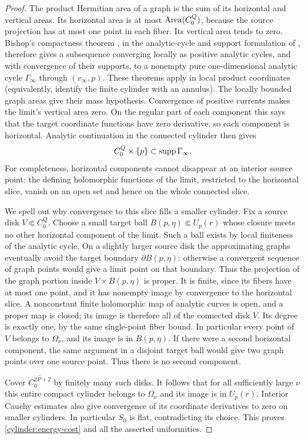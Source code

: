 \begin{proof}
The product Hermitian area of a graph is the sum of its horizontal and
vertical areas.  Its horizontal area is at most $\operatorname{Area}(C_0^Q)$,
because the source projection has at most one point in each fiber.
Its vertical area tends to zero.  Bishop's compactness theorem
\cite{Bishop1964}, in the analytic-cycle and support formulation of
\cite[Theorems~3.9--3.10, pp.~585--586]{HarveyShiffman1974}, therefore
gives a subsequence converging locally as positive analytic cycles,
and with convergence of their supports, to a nonempty pure
one-dimensional analytic cycle $\Gamma_\infty$ through
$(v_\infty,p)$.  These theorems apply in local product coordinates
(equivalently, identify the finite cylinder with an annulus).
The locally bounded graph areas give their mass hypothesis.
Convergence of positive currents makes the limit's vertical area zero.
On the regular part of each component this says that the
target coordinate functions have zero derivative, so each component
is horizontal.  Analytic continuation in the connected cylinder then
gives
\[
 C_0^Q\times\{p\}\subset\operatorname{supp}\Gamma_\infty.
\]
For completeness, horizontal components cannot disappear at an
interior source point: the defining holomorphic functions of the
limit, restricted to the horizontal slice, vanish on an open set and
hence on the whole connected slice.

We spell out why convergence to this slice fills a smaller cylinder.
Fix a source disk $V\Subset C_0^Q$.  Choose a small target ball
$B(p,\eta)\Subset U_p(r)$ whose closure meets no other horizontal
component of the limit.  Such a ball exists by local finiteness of
the analytic cycle.  On a slightly larger source disk the approximating
graphs eventually avoid the target boundary $\partial B(p,\eta)$:
otherwise a convergent sequence of graph points would give a limit
point on that boundary.  Thus the projection of the graph portion
inside $V\times B(p,\eta)$ is proper.  It is finite, since its fibers
have at most one point, and it has nonempty image by convergence to
the horizontal slice.  A nonconstant finite holomorphic map of
analytic curves is open, and a proper map is closed; its image is
therefore all of the connected disk $V$.  Its degree is exactly one,
by the same single-point fiber bound.  In particular every point of
$V$ belongs to $\Omega_\nu$, and its image is in $B(p,\eta)$.
If there were a second horizontal component, the same argument in a
disjoint target ball would give two graph points over one source
point.  Thus there is no second component.

Cover $\overline{C_0^{2P+2}}$ by finitely many such disks.  It follows
that for all sufficiently large $\nu$ this entire compact cylinder
belongs to $\Omega_\nu$ and its image is in $U_p(r)$.  Interior Cauchy
estimates also give convergence of its coordinate derivatives to
zero on smaller cylinders.  In particular $S_0$ is flat, contradicting
its choice.  This proves \eqref{cylinder:energy-cost} and all the
asserted uniformities.
\end{proof}


